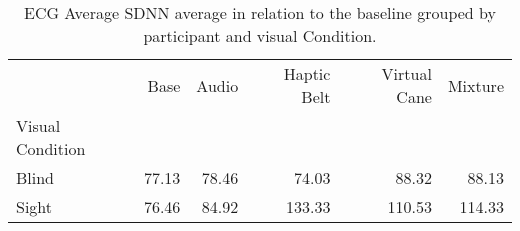 
\begin{table}[!htb]
\centering
\caption{ECG Average SDNN average in relation to the baseline grouped by participant and visual Condition.}
\label{tab:sdnn_average_group [ms]}
\begin{tabular}{lrrrrr}
\toprule
{} &   Base &  Audio & Haptic Belt & Virtual Cane & Mixture \\
Visual Condition &        &        &             &              &         \\
\midrule
Blind            &  77.13 &  78.46 &       74.03 &        88.32 &   88.13 \\
Sight            &  76.46 &  84.92 &      133.33 &       110.53 &  114.33 \\
\bottomrule
\end{tabular}
\end{table}

